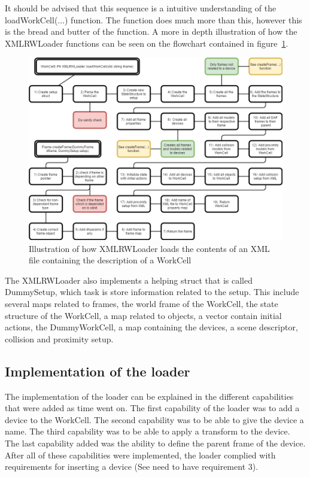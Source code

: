 It should be advised that this sequence is a intuitive understanding of the loadWorkCell(...) function. The function does much more than this, however this is the bread and butter of the function. A more in depth illustration of how the XMLRWLoader functions can be seen on the flowchart contained in figure~\ref{fig:ComplexLoadWC}.

\begin{figure}[h]
	\centering
	\includegraphics[scale=0.55]{Figures/ComplexLoadWC.png}
	\caption{Illustration of how XMLRWLoader loads the contents of an XML file containing the description of a WorkCell}
	\label{fig:ComplexLoadWC}
\end{figure}

The XMLRWLoader also implements a helping struct that is called DummySetup, which task is store information related to the setup. This include several maps related to frames, the world frame of the WorkCell, the state structure of the WorkCell, a map related to objects, a vector contain initial actions, the DummyWorkCell, a map containing the devices, a scene descriptor, collision and proximity setup.

\subsection{Implementation of the loader}
The implementation of the loader can be explained in the different capabilities that were added as time went on. The first capability of the loader was to add a device to the WorkCell. The second capability was to be able to give the device a name. The third capability was to be able to apply a transform to the device. The last capability added was the ability to define the parent frame of the device. After all of these capabilities were implemented, the loader complied with requirements for inserting a device (See need to have requirement 3).

